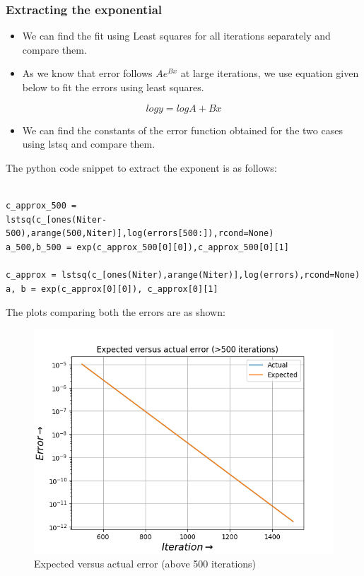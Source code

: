 \documentclass[11pt, a4paper]{article}
\begin{document}
\subsubsection*{Extracting the exponential}

\begin{itemize}
\item
  We can find the fit using Least squares for all iterations
  separately and compare them.
\item
  As we know that error follows \(Ae^{Bx}\) at large iterations, we use
  equation given below to fit the errors using least squares.
\end{itemize}

\begin{equation}
    logy = logA + Bx
\end{equation}

\begin{itemize}
\item
  We can find the constants of the error function obtained for the two cases
  using lstsq and compare them.
\end{itemize}

The python code snippet to extract the exponent is as follows:

   \begin{verbatim}
   
c_approx_500 = 
lstsq(c_[ones(Niter-500),arange(500,Niter)],log(errors[500:]),rcond=None)  
a_500,b_500 = exp(c_approx_500[0][0]),c_approx_500[0][1]

c_approx = lstsq(c_[ones(Niter),arange(Niter)],log(errors),rcond=None)
a, b = exp(c_approx[0][0]), c_approx[0][1] 
\end{verbatim}
\newpage
The plots comparing both the errors are as shown:

\begin{figure}[!tbh]
 \centering
 \includegraphics[scale=0.7]{Figure_5.png}  
 \caption{Expected versus actual error (above 500 iterations)}
\end{figure}
\end{document}

